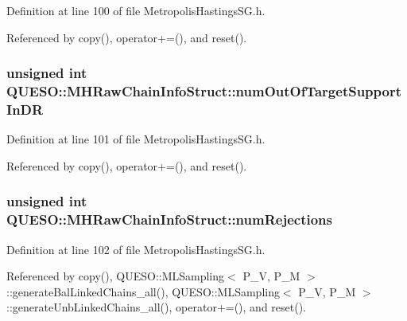 Definition at line 100 of file Metropolis\-Hastings\-S\-G.\-h.



Referenced by copy(), operator+=(), and reset().

\hypertarget{struct_q_u_e_s_o_1_1_m_h_raw_chain_info_struct_a783bb6c6b6dcab7f2bcc9fd0f49c588f}{
\subsubsection[{num\-Out\-Of\-Target\-Support\-In\-D\-R}]{\setlength{\rightskip}{0pt plus 5cm}unsigned int Q\-U\-E\-S\-O\-::\-M\-H\-Raw\-Chain\-Info\-Struct\-::num\-Out\-Of\-Target\-Support\-In\-D\-R}}\label{struct_q_u_e_s_o_1_1_m_h_raw_chain_info_struct_a783bb6c6b6dcab7f2bcc9fd0f49c588f}


Definition at line 101 of file Metropolis\-Hastings\-S\-G.\-h.



Referenced by copy(), operator+=(), and reset().

\hypertarget{struct_q_u_e_s_o_1_1_m_h_raw_chain_info_struct_a276f608de19910713df01124a971c79c}{
\subsubsection[{num\-Rejections}]{\setlength{\rightskip}{0pt plus 5cm}unsigned int Q\-U\-E\-S\-O\-::\-M\-H\-Raw\-Chain\-Info\-Struct\-::num\-Rejections}}\label{struct_q_u_e_s_o_1_1_m_h_raw_chain_info_struct_a276f608de19910713df01124a971c79c}


Definition at line 102 of file Metropolis\-Hastings\-S\-G.\-h.



Referenced by copy(), Q\-U\-E\-S\-O\-::\-M\-L\-Sampling$<$ P\-\_\-\-V, P\-\_\-\-M $>$\-::generate\-Bal\-Linked\-Chains\-\_\-all(), Q\-U\-E\-S\-O\-::\-M\-L\-Sampling$<$ P\-\_\-\-V, P\-\_\-\-M $>$\-::generate\-Unb\-Linked\-Chains\-\_\-all(), operator+=(), and reset().

